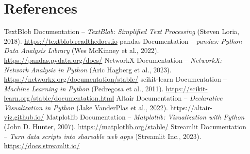 \documentclass[12pt]{article}
\begin{document}
\section*{References}
\begin{thebibliography}{9}
 TextBlob Documentation -- \textit{TextBlob: Simplified Text Processing} (Steven Loria, 2018). \url{https://textblob.readthedocs.io}
 pandas Documentation -- \textit{pandas: Python Data Analysis Library} (Wes McKinney et al., 2022). \url{https://pandas.pydata.org/docs/}
 NetworkX Documentation -- \textit{NetworkX: Network Analysis in Python} (Aric Hagberg et al., 2023). \url{https://networkx.org/documentation/stable/}
 scikit-learn Documentation -- \textit{Machine Learning in Python} (Pedregosa et al., 2011). \url{https://scikit-learn.org/stable/documentation.html}
 Altair Documentation -- \textit{Declarative Visualization in Python} (Jake VanderPlas et al., 2022). \url{https://altair-viz.github.io/}
 Matplotlib Documentation -- \textit{Matplotlib: Visualization with Python} (John D. Hunter, 2007). \url{https://matplotlib.org/stable/}
 Streamlit Documentation -- \textit{Turn data scripts into shareable web apps} (Streamlit Inc., 2023). \url{https://docs.streamlit.io/}
\end{thebibliography}
\end{document}

